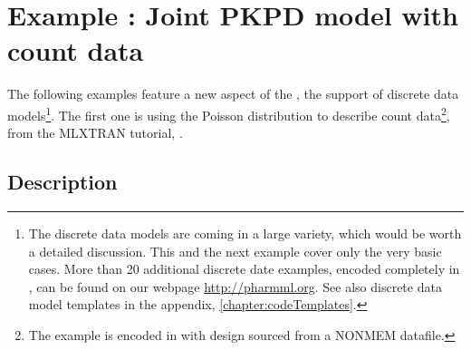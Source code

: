 
\section{Example \theexamples: Joint PKPD model with count data}
\label{sec:eg6}
The following examples feature a new aspect of the \pml, the support of discrete 
data models\footnote{The discrete data models are coming in a large variety, which 
would be worth a detailed discussion. This and the next example cover only the very 
basic cases. More than 20 additional discrete 
date examples, encoded completely in \pml, can be found on our webpage \url{http://pharmml.org}. 
See also discrete data model templates in the appendix, \ref{chapter:codeTemplates}.}. 
The first one is using the Poisson distribution to describe count data\footnote{The example is encoded 
in  with design sourced from a NONMEM datafile.}, 
from the MLXTRAN tutorial, \cite{Monolix4.3Tutorial:2014}.
\subsection{Description}
\label{subsec:exp6_intro}
 
